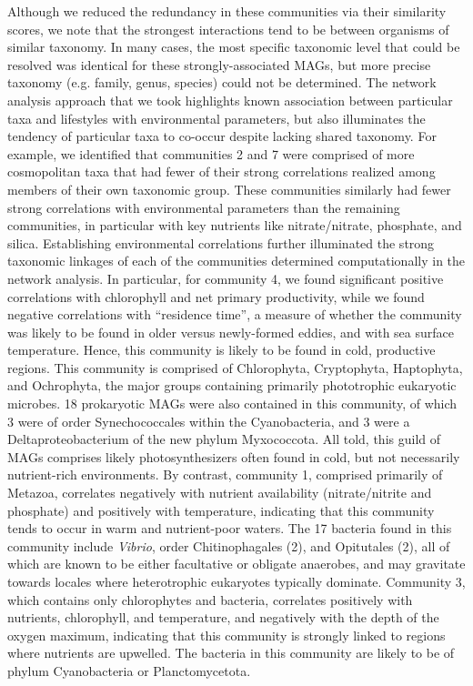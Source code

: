 \documentclass[12pt]{article}
\numberwithin{equation}{section}
\begin{document}
Although we reduced the redundancy in these communities via their similarity scores, we note that the strongest interactions tend to be between organisms of similar taxonomy. In many cases, the most specific taxonomic level that could be resolved was identical for these strongly-associated MAGs, but more precise taxonomy (e.g. family, genus, species) could not be determined. The network analysis approach that we took highlights known association between particular taxa and lifestyles with environmental parameters, but also illuminates the tendency of particular taxa to co-occur despite lacking shared taxonomy. For example, we identified that communities 2 and 7 were comprised of more cosmopolitan taxa that had fewer of their strong correlations realized among members of their own taxonomic group. These communities similarly had fewer strong correlations with environmental parameters than the remaining communities, in particular with key nutrients like nitrate/nitrate, phosphate, and silica. Establishing environmental correlations further illuminated the strong taxonomic linkages of each of the communities determined computationally in the network analysis. In particular, for community 4, we found significant positive correlations with chlorophyll and net primary productivity, while we found negative correlations with ``residence time'', a measure of whether the community was likely to be found in older versus newly-formed eddies, and with sea surface temperature. Hence, this community is likely to be found in cold, productive regions. This community is comprised of Chlorophyta, Cryptophyta, Haptophyta, and Ochrophyta, the major groups containing primarily phototrophic eukaryotic microbes. 18 prokaryotic MAGs were also contained in this community, of which 3 were of order Synechococcales within the Cyanobacteria, and 3 were a Deltaproteobacterium of the new phylum Myxococcota. All told, this guild of MAGs comprises likely photosynthesizers often found in cold, but not necessarily nutrient-rich environments. By contrast, community 1, comprised primarily of Metazoa, correlates negatively with nutrient availability (nitrate/nitrite and phosphate) and positively with temperature, indicating that this community tends to occur in warm and nutrient-poor waters. The 17 bacteria found in this community include \textit{Vibrio}, order Chitinophagales (2), and Opitutales (2), all of which are known to be either facultative or obligate anaerobes, and may gravitate towards locales where heterotrophic eukaryotes typically dominate. Community 3, which contains only chlorophytes and bacteria, correlates positively with nutrients, chlorophyll, and temperature, and negatively with the depth of the oxygen maximum, indicating that this community is strongly linked to regions where nutrients are upwelled. The bacteria in this community are likely to be of phylum Cyanobacteria or Planctomycetota. 
\end{document}
